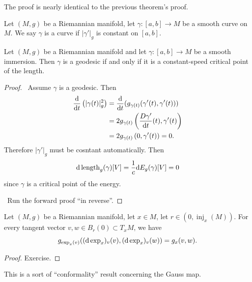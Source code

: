 The proof is nearly identical to the previous theorem's proof.

\begin{definition}
Let $(M,g)$ be a Riemannian manifold, let $\gamma\colon[a,b]\to M$
be a smooth curve on $M$. We say $\gamma$ is a 
curve if $|\gamma'|_{g}$ is constant on $[a,b]$.
\end{definition}

\begin{corollary}
Let $(M,g)$ be a Riemannian manifold and let $\gamma\colon[a,b]\to M$
be a smooth immersion. Then $\gamma$ is a geodesic if and only if it
is a constant-speed critical point of the length.
\end{corollary}

\begin{proof}
\forwardproof\ Assume $\gamma$ is a geodesic. Then
\begin{subequations}
  \begin{align}
\frac{\mathrm{d}}{\mathrm{d} t}\left(|\gamma(t)|_{g}^{2}\right)
&=\frac{\mathrm{d}}{\mathrm{d} t}(g_{\gamma(t)}(\gamma'(t),\gamma'(t)))\\
&=2g_{\gamma(t)}\left(\frac{D\gamma'}{\mathrm{d} t}(t),\gamma'(t)\right)\\
&=2g_{\gamma(t)}\left(0,\gamma'(t)\right)=0.
  \end{align}
\end{subequations}
Therefore $|\gamma'|_{g}$ must be cosntant automatically. Then
\begin{equation}
\mathrm{d}\operatorname{length}_{g}(\gamma)[V]=\frac{1}{c}\mathrm{d} E_{g}(\gamma)[V]=0
\end{equation}
since $\gamma$ is a critical point of the energy.

\backwardproof\ Run the forward proof ``in reverse''.
\end{proof}

\begin{lemma}[Gauss]
Let $(M,g)$ be a Riemannian manifold, let $x\in M$, let $r\in(0,\operatorname{inj}_{x}(M))$.
For every tangent vector $v,w\in B_{r}(0)\subset T_{x}M$, we have
\begin{equation}
g_{\exp_{x}(v)}((\mathrm{d}\exp_{x})_{v}(v),(\mathrm{d}\exp_{x})_{v}(w))=g_{x}(v,w).
\end{equation}
\end{lemma}

\begin{proof}
Exercise.
\end{proof}

\begin{remark}
This is a sort of ``conformality'' result concerning the Gauss map.
\end{remark}